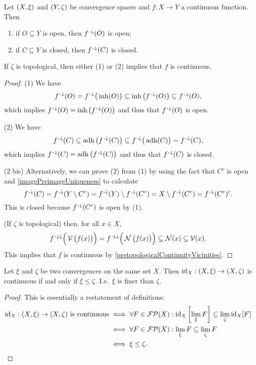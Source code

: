 \begin{corollary} \label{preimageOpenClosed}
Let $\sSet{X,\xi}$ and $\sSet{Y,\zeta}$ be convergence spaces and $f: X\to Y$ a continuous function. Then
\begin{enumerate}
\item if $O\subseteq Y$ is open, then $f^{\text{\hspace{0.15em}-}\downarrow}(O)$ is open;
\item if $C\subseteq Y$ is closed, then $f^{\text{\hspace{0.15em}-}\downarrow}(C)$ is closed.
\end{enumerate}
If $\zeta$ is topological, then either (1) or (2) implies that $f$ is continuous.
\end{corollary}
\begin{proof}
(1) We have
\[ f^{\text{\hspace{0.15em}-}\downarrow}(O) = f^{\text{\hspace{0.15em}-}\downarrow}\big(\operatorname{inh}(O)\big) \subseteq \operatorname{inh}\big(f^{\text{\hspace{0.15em}-}\downarrow}(O)\big) \subseteq f^{\text{\hspace{0.15em}-}\downarrow}(O), \]
which implies $f^{\text{\hspace{0.15em}-}\downarrow}(O) = \operatorname{inh}\big(f^{\text{\hspace{0.15em}-}\downarrow}(O)\big)$ and thus that $f^{\text{\hspace{0.15em}-}\downarrow}(O)$ is open.

(2) We have
\[ f^{\text{\hspace{0.15em}-}\downarrow}(C) \subseteq \operatorname{adh}\big(f^{\text{\hspace{0.15em}-}\downarrow}(C)\big) \subseteq f^{\text{\hspace{0.15em}-}\downarrow}\big(\operatorname{adh}(C)\big) = f^{\text{\hspace{0.15em}-}\downarrow}(C), \]
which implies $f^{\text{\hspace{0.15em}-}\downarrow}(C) = \operatorname{adh}\big(f^{\text{\hspace{0.15em}-}\downarrow}(C)\big)$ and thus that $f^{\text{\hspace{0.15em}-}\downarrow}(C)$ is closed.

(2 bis) Alternatively, we can prove (2) from (1) by using the fact that $C^c$ is open and \ref{imagePreimageUniqueness} to calculate
\[ f^{\text{\hspace{0.15em}-}\downarrow}(C) = f^{\text{\hspace{0.15em}-}\downarrow}(Y\setminus C^c) = f^{\text{\hspace{0.15em}-}\downarrow}(Y)\setminus f^{\text{\hspace{0.15em}-}\downarrow}(C^c) = X\setminus f^{\text{\hspace{0.15em}-}\downarrow}(C^c) = f^{\text{\hspace{0.15em}-}\downarrow}(C^c)^c. \]
This is closed because $f^{\text{\hspace{0.15em}-}\downarrow}(C^c)$ is open by (1).

(If $\zeta$ is topological) then, for all $x\in X$,
\[ f^{{\text{\hspace{0.15em}-}\downarrow}\downarrow}\Big(\operatorname{\mathcal{V}}\big(f(x)\big)\Big) = f^{{\text{\hspace{0.15em}-}\downarrow}\downarrow}\Big(\operatorname{\mathcal{N}}\big(f(x)\big)\Big) \subseteq \operatorname{\mathcal{N}}(x) \subseteq \operatorname{\mathcal{V}}(x). \]
This implies that $f$ is continuous by \ref{pretopologicalContinuityVicinities}.
\end{proof}


\begin{lemma} \label{identityContinuity}
Let $\xi$ and $\zeta$ be two convergences on the same set $X$. Then $\id_X: \sSet{X,\xi} \to \sSet{X,\zeta}$ is continuous \textup{if and only if} $\xi \leq \zeta$. I.e.\ $\xi$ is finer than $\zeta$.
\end{lemma}
\begin{proof}
This is essentially a restatement of definitions:
\begin{align*}
\text{$\id_X: \sSet{X,\xi} \to \sSet{X,\zeta}$ is continuous} &\iff \forall F\in\powerfilters(X): \id_X\left[\lim_\xi F \right] \subseteq \lim_\zeta \id_X[F] \\
&\iff \forall F\in\powerfilters(X): \lim_\xi F \subseteq \lim_\zeta F \\
&\iff \xi \leq \zeta.
\end{align*}
\end{proof}

